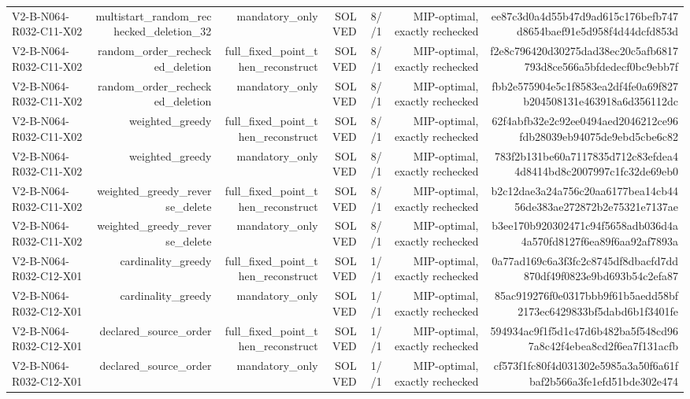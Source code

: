 {\begin{longtable}{lrrrrrr}
V2-B-N064-R032-C11-X02 & multistart\_random\_rechecked\_deletion\_32 & mandatory\_only & SOLVED & 8//1 & MIP-optimal, exactly rechecked & ee87c3d0a4d55b47d9ad615c176befb747d8654baef91e5d958f4d44dcfd853d \\
V2-B-N064-R032-C11-X02 & random\_order\_rechecked\_deletion & full\_fixed\_point\_then\_reconstruct & SOLVED & 8//1 & MIP-optimal, exactly rechecked & f2e8c796420d30275dad38ec20c5afb6817793d8ce566a5bfdedecf0bc9ebb7f \\
V2-B-N064-R032-C11-X02 & random\_order\_rechecked\_deletion & mandatory\_only & SOLVED & 8//1 & MIP-optimal, exactly rechecked & fbb2e575904e5c1f8583ea2df4fe0a69f827b204508131e463918a6d356112dc \\
V2-B-N064-R032-C11-X02 & weighted\_greedy & full\_fixed\_point\_then\_reconstruct & SOLVED & 8//1 & MIP-optimal, exactly rechecked & 62f4abfb32e2c92ee0494aed2046212ce96fdb28039eb94075de9ebd5cbe6c82 \\
V2-B-N064-R032-C11-X02 & weighted\_greedy & mandatory\_only & SOLVED & 8//1 & MIP-optimal, exactly rechecked & 783f2b131be60a7117835d712c83efdea44d8414bd8c2007997c1fc32de69eb0 \\
V2-B-N064-R032-C11-X02 & weighted\_greedy\_reverse\_delete & full\_fixed\_point\_then\_reconstruct & SOLVED & 8//1 & MIP-optimal, exactly rechecked & b2c12dae3a24a756c20aa6177bea14cb4456de383ae272872b2e75321e7137ae \\
V2-B-N064-R032-C11-X02 & weighted\_greedy\_reverse\_delete & mandatory\_only & SOLVED & 8//1 & MIP-optimal, exactly rechecked & b3ee170b920302471c94f5658adb036d4a4a570fd8127f6ea89f6aa92af7893a \\
V2-B-N064-R032-C12-X01 & cardinality\_greedy & full\_fixed\_point\_then\_reconstruct & SOLVED & 1//1 & MIP-optimal, exactly rechecked & 0a77ad169c6a3f3fc2c8745df8dbacfd7dd870df49f0823e9bd693b54c2efa87 \\
V2-B-N064-R032-C12-X01 & cardinality\_greedy & mandatory\_only & SOLVED & 1//1 & MIP-optimal, exactly rechecked & 85ac919276f0e0317bbb9f61b5aedd58bf2173ec6429833bf5dabd6b1f3401fe \\
V2-B-N064-R032-C12-X01 & declared\_source\_order & full\_fixed\_point\_then\_reconstruct & SOLVED & 1//1 & MIP-optimal, exactly rechecked & 594934ac9f1f5d1c47d6b482ba5f548cd967a8c42f4ebea8cd2f6ea7f131acfb \\
V2-B-N064-R032-C12-X01 & declared\_source\_order & mandatory\_only & SOLVED & 1//1 & MIP-optimal, exactly rechecked & cf573f1fc80f4d031302e5985a3a50f6a61fbaf2b566a3fe1efd51bde302e474 \\

\end{longtable}}
